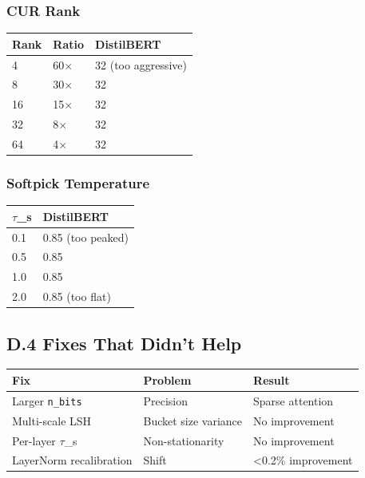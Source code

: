 \subsubsection{CUR Rank}

\begin{table}[H]
\centering
\small
\begin{tabular}{lll}
\toprule
\textbf{Rank} & \textbf{Ratio} & \textbf{DistilBERT} \\
\midrule
4 & 60$\times$ & 32 (too aggressive) \\
8 & 30$\times$ & 32 \\
16 & 15$\times$ & 32 \\
32 & 8$\times$ & 32 \\
64 & 4$\times$ & 32 \\
\bottomrule
\end{tabular}
\end{table}

\subsubsection{Softpick Temperature}

\begin{table}[H]
\centering
\small
\begin{tabular}{ll}
\toprule
\textbf{$\tau$\_s} & \textbf{DistilBERT} \\
\midrule
0.1 & 0.85 (too peaked) \\
0.5 & 0.85 \\
1.0 & 0.85 \\
2.0 & 0.85 (too flat) \\
\bottomrule
\end{tabular}
\end{table}

\subsection{D.4 Fixes That Didn't Help}

\begin{table}[H]
\centering
\small
\begin{tabular}{lll}
\toprule
\textbf{Fix} & \textbf{Problem} & \textbf{Result} \\
\midrule
Larger \texttt{n\_bits} & Precision & Sparse attention \\
Multi-scale LSH & Bucket size variance & No improvement \\
Per-layer $\tau$\_s & Non-stationarity & No improvement \\
LayerNorm recalibration & Shift & <0.2\% improvement \\
\bottomrule
\end{tabular}
\end{table}

